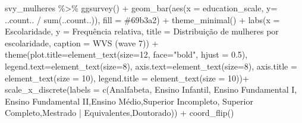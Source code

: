 \documentclass[
]{article}
\newenvironment{Shaded}{\begin{snugshade}}{\end{snugshade}}
\newcommand{\AttributeTok}[1]{\textcolor[rgb]{0.77,0.63,0.00}{#1}}
\newcommand{\DecValTok}[1]{\textcolor[rgb]{0.00,0.00,0.81}{#1}}
\newcommand{\FloatTok}[1]{\textcolor[rgb]{0.00,0.00,0.81}{#1}}
\newcommand{\FunctionTok}[1]{\textcolor[rgb]{0.00,0.00,0.00}{#1}}
\newcommand{\NormalTok}[1]{#1}
\newcommand{\SpecialCharTok}[1]{\textcolor[rgb]{0.00,0.00,0.00}{#1}}
\newcommand{\StringTok}[1]{\textcolor[rgb]{0.31,0.60,0.02}{#1}}
\begin{document}
\begin{Shaded}
\begin{Highlighting}[]
\NormalTok{svy\_mulheres }\SpecialCharTok{\%\textgreater{}\%}
  \FunctionTok{ggsurvey}\NormalTok{() }\SpecialCharTok{+}
  \FunctionTok{geom\_bar}\NormalTok{(}\FunctionTok{aes}\NormalTok{(}\AttributeTok{x =}\NormalTok{ education\_scale, }\AttributeTok{y=}\NormalTok{ ..count.. }\SpecialCharTok{/} \FunctionTok{sum}\NormalTok{(..count..)), }\AttributeTok{fill =} \StringTok{\textquotesingle{}\#69b3a2\textquotesingle{}}\NormalTok{) }\SpecialCharTok{+}
  \FunctionTok{theme\_minimal}\NormalTok{() }\SpecialCharTok{+}
  \FunctionTok{labs}\NormalTok{(}\AttributeTok{x =} \StringTok{\textquotesingle{}Escolaridade\textquotesingle{}}\NormalTok{,}
       \AttributeTok{y =} \StringTok{\textquotesingle{}Frequência relativa\textquotesingle{}}\NormalTok{,}
       \AttributeTok{title =} \StringTok{\textquotesingle{}Distribuição de mulheres por escolaridade\textquotesingle{}}\NormalTok{,}
       \AttributeTok{caption =} \StringTok{\textquotesingle{}WVS (wave 7)\textquotesingle{}}\NormalTok{) }\SpecialCharTok{+}
  \FunctionTok{theme}\NormalTok{(}\AttributeTok{plot.title=}\FunctionTok{element\_text}\NormalTok{(}\AttributeTok{size=}\DecValTok{12}\NormalTok{, }\AttributeTok{face=}\StringTok{"bold"}\NormalTok{, }\AttributeTok{hjust =} \FloatTok{0.5}\NormalTok{),}
        \AttributeTok{legend.text=}\FunctionTok{element\_text}\NormalTok{(}\AttributeTok{size=}\DecValTok{8}\NormalTok{),}
        \AttributeTok{axis.text=}\FunctionTok{element\_text}\NormalTok{(}\AttributeTok{size=}\DecValTok{8}\NormalTok{),}
        \AttributeTok{axis.title =} \FunctionTok{element\_text}\NormalTok{(}\AttributeTok{size =} \DecValTok{10}\NormalTok{),}
        \AttributeTok{legend.title =} \FunctionTok{element\_text}\NormalTok{(}\AttributeTok{size =} \DecValTok{10}\NormalTok{))}\SpecialCharTok{+}
  \FunctionTok{scale\_x\_discrete}\NormalTok{(}\AttributeTok{labels =} \FunctionTok{c}\NormalTok{(}\StringTok{\textquotesingle{}Analfabeta\textquotesingle{}}\NormalTok{, }\StringTok{\textquotesingle{}Ensino Infantil\textquotesingle{}}\NormalTok{, }\StringTok{\textquotesingle{}Ensino Fundamental I\textquotesingle{}}\NormalTok{,}
                              \StringTok{\textquotesingle{}Ensino Fundamental II\textquotesingle{}}\NormalTok{,}\StringTok{\textquotesingle{}Ensino Médio\textquotesingle{}}\NormalTok{,}\StringTok{\textquotesingle{}Superior Incompleto\textquotesingle{}}\NormalTok{,}
                              \StringTok{\textquotesingle{}Superior Completo\textquotesingle{}}\NormalTok{,}\StringTok{\textquotesingle{}Mestrado | Equivalentes\textquotesingle{}}\NormalTok{,}\StringTok{\textquotesingle{}Doutorado\textquotesingle{}}\NormalTok{)) }\SpecialCharTok{+} 
  \FunctionTok{coord\_flip}\NormalTok{()}
\end{Highlighting}
\end{Shaded}
\end{document}
